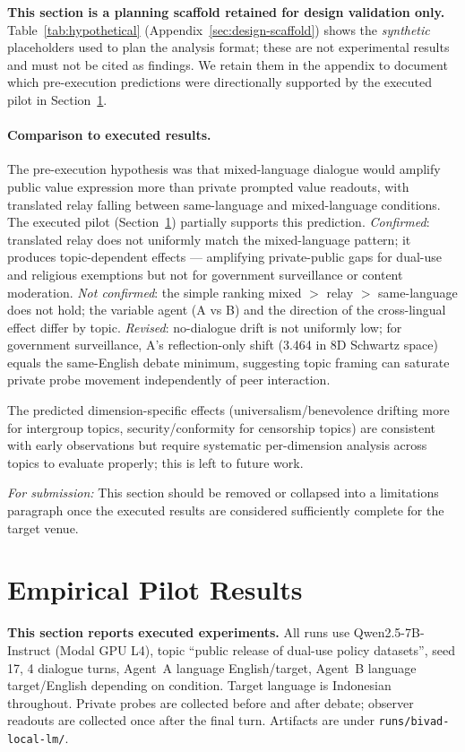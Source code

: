 \documentclass{article}
\begin{document}
\textbf{This section is a planning scaffold retained for design validation only.} Table~\ref{tab:hypothetical} (Appendix~\ref{sec:design-scaffold}) shows the \emph{synthetic} placeholders used to plan the analysis format; these are not experimental results and must not be cited as findings. We retain them in the appendix to document which pre-execution predictions were directionally supported by the executed pilot in Section~\ref{sec:empirical}.

\paragraph{Comparison to executed results.}
The pre-execution hypothesis was that mixed-language dialogue would amplify public value expression more than private prompted value readouts, with translated relay falling between same-language and mixed-language conditions. The executed pilot (Section~\ref{sec:empirical}) partially supports this prediction. \emph{Confirmed}: translated relay does not uniformly match the mixed-language pattern; it produces topic-dependent effects --- amplifying private-public gaps for dual-use and religious exemptions but not for government surveillance or content moderation. \emph{Not confirmed}: the simple ranking mixed $>$ relay $>$ same-language does not hold; the variable agent (A vs B) and the direction of the cross-lingual effect differ by topic. \emph{Revised}: no-dialogue drift is not uniformly low; for government surveillance, A's reflection-only shift (3.464 in 8D Schwartz space) equals the same-English debate minimum, suggesting topic framing can saturate private probe movement independently of peer interaction.

The predicted dimension-specific effects (universalism/benevolence drifting more for intergroup topics, security/conformity for censorship topics) are consistent with early observations but require systematic per-dimension analysis across topics to evaluate properly; this is left to future work.

\emph{For submission:} This section should be removed or collapsed into a limitations paragraph once the executed results are considered sufficiently complete for the target venue.

\section{Empirical Pilot Results}
\label{sec:empirical}

\textbf{This section reports executed experiments.} All runs use Qwen2.5-7B-Instruct (Modal GPU L4), topic ``public release of dual-use policy datasets'', seed 17, 4 dialogue turns, Agent~A language English/target, Agent~B language target/English depending on condition. Target language is Indonesian throughout. Private probes are collected before and after debate; observer readouts are collected once after the final turn. Artifacts are under \texttt{runs/bivad-local-lm/}.
\end{document}
